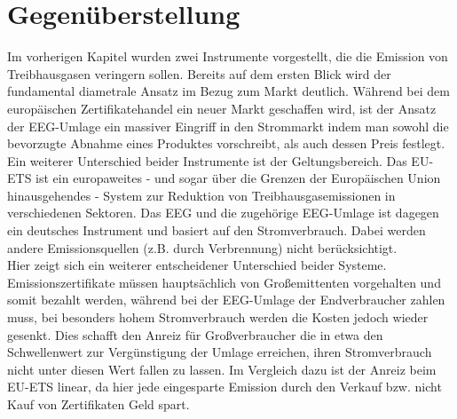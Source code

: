 \chapter{Gegenüberstellung}
Im vorherigen Kapitel wurden zwei Instrumente vorgestellt, die die Emission von Treibhausgasen veringern sollen.
Bereits auf dem ersten Blick wird der fundamental diametrale Ansatz im Bezug zum Markt deutlich.
Während bei dem europäischen Zertifikatehandel ein neuer Markt geschaffen wird, ist der Ansatz der EEG-Umlage ein massiver Eingriff in den Strommarkt indem man sowohl die bevorzugte Abnahme eines Produktes vorschreibt, als auch dessen Preis festlegt.\\
Ein weiterer Unterschied beider Instrumente ist der Geltungsbereich. Das EU-ETS ist ein europaweites - und sogar über die Grenzen der Europäischen Union hinausgehendes - System zur Reduktion von Treibhausgasemissionen in verschiedenen Sektoren. 
Das EEG und die zugehörige EEG-Umlage ist dagegen ein deutsches Instrument und basiert auf den Stromverbrauch. Dabei werden andere Emissionsquellen (z.B. durch Verbrennung) nicht berücksichtigt.\\
Hier zeigt sich ein weiterer entscheidener Unterschied beider Systeme.
Emissionszertifikate müssen hauptsächlich von Großemittenten vorgehalten und somit bezahlt werden, während bei der EEG-Umlage der Endverbraucher zahlen muss, bei besonders hohem Stromverbrauch werden die Kosten jedoch wieder gesenkt.
Dies schafft den Anreiz für Großverbraucher die in etwa den Schwellenwert zur Vergünstigung der Umlage erreichen, ihren Stromverbrauch nicht unter diesen Wert fallen zu lassen.
Im Vergleich dazu ist der Anreiz beim EU-ETS linear, da hier jede eingesparte Emission durch den Verkauf bzw. nicht Kauf von Zertifikaten Geld spart.
